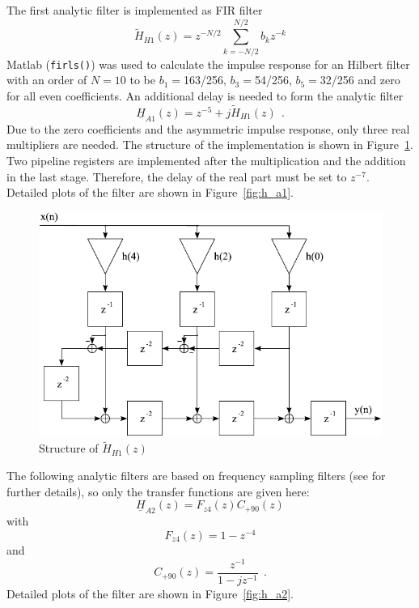 \documentclass[a4paper,BCOR7mm,12pt,pointlessnumbers,bibtotoc]{scrartcl}
\begin{document}
The first analytic filter is implemented as FIR filter 
\begin{equation}
	\widetilde{H}_{H1}(z) = z^{-N/2} \sum_{k=-N/2}^{N/2} b_k z^{-k}
\end{equation}
Matlab (\verb|firls()|) was used to calculate the impulse response for an Hilbert filter with an order of $N=10$ to be $b_1=$163/256, $b_3=$54/256, $b_5=$32/256 and zero for all even coefficients. An additional delay is needed to form the analytic filter
\begin{equation}	
	\underline{H}_{A1}(z) = z^{-5} + j \widetilde{H}_{H1}(z) \ \ .
\end{equation}
Due to the zero coefficients and the asymmetric impulse response, only three real multipliers are needed. The structure of the implementation is shown in Figure~\ref{fig:h_a_1_filter_impl}. Two pipeline registers are implemented after the multiplication and the addition in the last stage. Therefore, the delay of the real part must be set to $z^{-7}$. Detailed plots of the filter are shown in Figure~\ref{fig:h_a1}.

\begin{figure}[H]
  \centering
    \includegraphics{images/h_a_1_filter_impl}
  \caption{Structure of $\widetilde{H}_{H1}(z)$}
  \label{fig:h_a_1_filter_impl}
\end{figure}

The following analytic filters are based on frequency sampling filters (see \cite{ks08} for further details), so only the transfer functions are given here:
\begin{equation}
  \underline{H}_{A2}(z) = F_{z4}(z)C_{+90}(z)
\end{equation}
with
\begin{equation}	
  F_{z4}(z) = 1-z^{-4}
\end{equation}
and
\begin{equation}	
  C_{+90}(z) = \frac{z^{-1}}{1 - j z^{-1}} \ \ .
\end{equation}
Detailed plots of the filter are shown in Figure~\ref{fig:h_a2}. 
\end{document}

